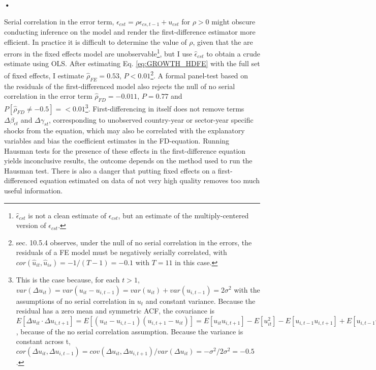 \textbf{\textbf{•}}\documentclass[a4paper]{article}
\begin{document}
Serial correlation in the error term, $\epsilon_{cst} = \rho \epsilon_{cs,t-1} + u_{cst}$ for $\rho > 0$ might obscure conducting inference on the model and render the first-difference estimator more efficient. In practice it is difficult to determine the value of $\rho$, given that the are errors in the fixed effects model are unobservable\footnote{$\hat{\epsilon}_{cst}$ is not a clean estimate of $\epsilon_{cst}$, but an estimate of the multiply-centered version of $\epsilon_{cst}$.}, but I use $\hat{\epsilon}_{cst}$ to obtain a crude estimate using OLS. After estimating Eq. \ref{eq:GROWTH_HDFE} with the full set of fixed effects, I estimate $\hat{\rho}_{FE} = 0.53$, $P<0.01$\footnote{\citet{wooldridge2010econometric} sec. 10.5.4 observes, under the null of no serial correlation in the errors, the residuals of a FE model must be negatively serially correlated, with $cor(\hat{u}_{it}, \hat{u}_{is})=-1/(T-1) = -0.1$ with $T = 11$ in this case.}. A formal panel-test based on the residuals of the first-differenced model also rejects the null of no serial correlation in the error term $\hat{\rho}_{FD} = -0.011$, $P=0.77$ and $P[\hat{\rho}_{FD} \neq -0.5]=<0.01$\footnote{This is the case because, for each $t > 1$, $var(\Delta u_{it}) = var(u_{it} - u_{i,t-1}) = var(u_{it}) + var(u_{i,t-1}) = 2\sigma^2$ with the assumptions of no serial correlation in $u_t$ and constant variance. Because the residual has a zero mean and symmetric ACF, the covariance is $E[\Delta u_{it}⋅\Delta u_{i,t+1}] = E[(u_{it} - u_{i,t-1})(u_{i,t+1} - u_{it})] = E[u_{it} u_{i,t+1}] - E[u_{it}^2] - E[u_{i,t-1} u_{i,t+1}] + E[u_{i,t-1} u_{it}] = -E[u_{it}^2] = -\sigma^2$, because of the no serial correlation assumption. Because the variance is constant across t, $cor(\Delta u_{it},  \Delta u_{i,t-1}) = cov(\Delta u_{it},  \Delta u_{i,t+1})/var(\Delta u_{it}) = -\sigma^2/2\sigma^2 = -0.5$.}. First-differencing in itself does not remove terms $\Delta\beta_{ct}$ and $\Delta\gamma_{st}$, corresponding to unobserved country-year or sector-year specific shocks from the equation, which may also be correlated with the explanatory variables and bias the coefficient estimates in the FD-equation. Running Hausman tests for the presence of these effects in the first-difference equation yields inconclusive results, the outcome depends on the method used to run the Hausman test. There is also a danger that putting fixed effects on a first-differenced equation estimated on data of not very high quality removes too much useful information.   \newline
\end{document}
